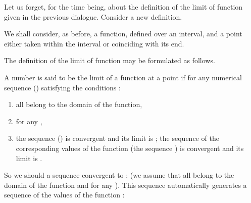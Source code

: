 \begin{p}
Let us forget, for the time being, about the definition of the limit of function given in the previous dialogue. Consider a new definition. 

We shall consider, as before, a function,  defined over an interval, and a point  either taken within the interval or coinciding with its end.

The definition of the limit of function may be formulated as follows.

\begin{defn}
A number  is said to be the limit of a function  at a point  if for any numerical sequence () satisfying the conditions :
\begin{enumerate}[nosep, label=(\arabic*)]
  \item all  belong to the domain of the function,
  \item {} for any ,
  \item the sequence () is convergent and its limit is ; the sequence of the corresponding values of the function (the sequence ) is convergent and its limit is .
  \end{enumerate}
\par\vspace{-1.4\baselineskip}
\qedhere
\end{defn}

So we should  a sequence convergent to  :
(we assume that all  belong to the domain of the function and  for any ). This sequence automatically generates a sequence of the values of the function :


\end{p}
